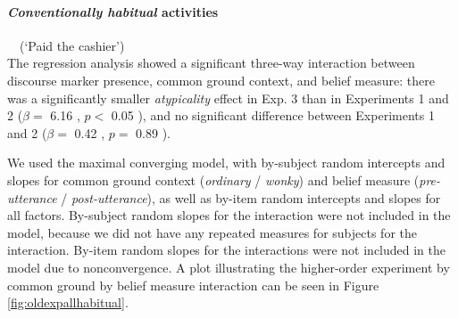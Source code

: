 \documentclass{sp}\usepackage[]{graphicx}\usepackage[]{color}
\begin{document}
\paragraph*{\textit{Conventionally habitual} activities}$\quad$(`Paid the cashier')\\

The regression analysis showed a significant three-way interaction between discourse marker presence, common ground context, and belief measure: there was a significantly smaller \textit{atypicality} effect in Exp. 3 than in Experiments 1 and 2 ($\beta=$%
6.16%
, $p<$%
0.05%
), and no significant difference between Experiments 1 and 2 ($\beta=$%
0.42%
, $p=$%
0.89%
).

We used the maximal converging model, with by-subject random intercepts and slopes for common ground context (\textit{ordinary} / \textit{wonky}) and belief measure (\textit{pre-utterance} / \textit{post-utterance}), as well as by-item random intercepts and slopes for all factors. By-subject random slopes for the interaction were not included in the model, because we did not have any repeated measures for subjects for the interaction.  By-item random slopes for the interactions were not included in the model due to nonconvergence. A plot illustrating the higher-order experiment by common ground by belief measure interaction can be seen in Figure \ref{fig:oldexpallhabitual}.
\end{document}
